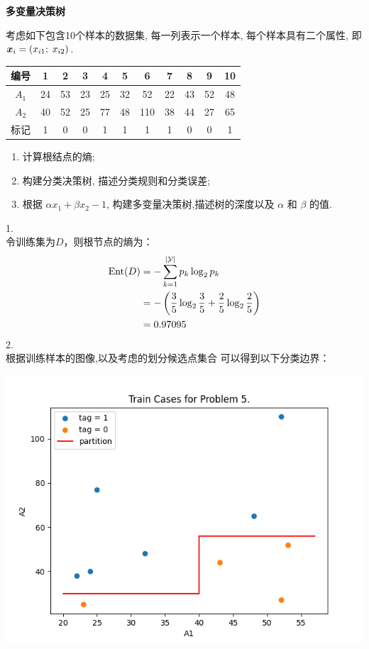 \documentclass[answers]{exam}  %
\begin{document}
\begin{questions}
\question [20] \textbf{多变量决策树}

考虑如下包含10个样本的数据集, 每一列表示一个样本, 每个样本具有二个属性, 即${\boldsymbol{x}}_i = (x_{i1};\; x_{i2})$.
\begin{table}[ht]
    \begin{center}
    \begin{tabular}{ccccccccccc}
    \hline 编号 & 1 & 2 & 3 & 4 & 5 & 6 & 7 & 8 & 9 & 10 \\
    \hline $A_1$ & 24 & 53 & 23 & 25 & 32 & 52 & 22 & 43 & 52 & 48 \\ 
    $A_2$ & 40 & 52 & 25 & 77 & 48 & 110 & 38 & 44 & 27 & 65\\
    \hline 标记 & 1 & 0 & 0 & 1 & 1 & 1 & 1 & 0 & 0 & 1\\
    \hline
    \end{tabular}
    \end{center}
\end{table}
\begin{enumerate}
    \item 计算根结点的熵; 
    \item 构建分类决策树, 描述分类规则和分类误差; 
    \item 根据 $\alpha x_{1}+\beta x_{2}-1$,  构建多变量决策树,描述树的深度以及 $\alpha$ 和 $\beta$ 的值. 
\end{enumerate}
	\begin{solution}
	    1.\\
        令训练集为$D$，则根节点的熵为：
        $$
        \begin{aligned}
            \operatornamewithlimits{Ent}(D)
            &=-\sum^{|\mathcal Y|}_{k=1}p_k\log_2 p_k\\
            &=-\left(\frac35\log_2\frac35+\frac25\log_2\frac25 \right)\\
            &=0.97095\\
        \end{aligned}
        $$
        2.\\
        根据训练样本的图像,以及考虑的划分候选点集合
        可以得到以下分类边界：\\
        \centerline{\includegraphics[width=0.82\linewidth]{5.2.png}}\\

\end{solution}
\end{questions}
\end{document}
